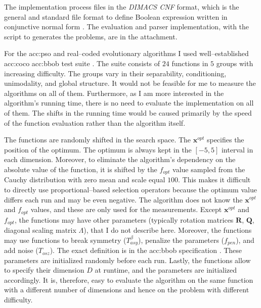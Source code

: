 The implementation process files in the \textit{DIMACS CNF} format, which is the general and standard file format to define Boolean expression written in conjunctive normal form \citep{challenge1993satisfiability}. The evaluation and parser implementation, with the script to generates the problems, are in the attachment.

For the \acrlong{acc:pso} and real--coded evolutionary algorithms I used well--established \acrfull{acc:coco} \acrfull{acc:bbob} test suite \citep{hansen2010comparing}. The suite consists of $24$ functions in $5$ groups with increasing difficulty. The groups vary in their separability, conditioning, unimodality, and global structure. It would not be feasible for me to measure the algorithms on all of them. Furthermore, as I am more interested in the algorithm's running time, there is no need to evaluate the implementation on all of them. The shifts in the running time would be caused primarily by the speed of the function evaluation rather than the algorithm itself.

The functions are randomly shifted in the search space. The $\mathbf{x}^{opt}$ specifies the position of the optimum. The optimum is always kept in the $\left[-5,5\right]$ interval in each dimension. Moreover, to eliminate the algorithm's dependency on the absolute value of the function, it is shifted by the $f_{opt}$ value sampled from the Cauchy distribution with zero mean and scale equal $100$. This makes it difficult to directly use proportional--based selection operators because the optimum value differs each run and may be even negative. The algorithm does not know the $\mathbf{x}^{opt}$ and $f_{opt}$ values, and these are only used for the measurements. Except $\mathbf{x}^{opt}$ and $f_{opt}$, the functions may have other parameters (typically rotation matrices $\mathbf{R}$, $\mathbf{Q}$, diagonal scaling matrix $\Lambda$), that I do not describe here. Moreover, the functions may use functions to break symmetry ($T_{asy}^\beta$), penalize the parameters ($f_{pen}$), and add noise ($T_{osz}$). The exact definition is in the \acrshort{acc:bbob} specification \citep{hansen2010comparing}. These parameters are initialized randomly before each run. Lastly, the functions allow to specify their dimension $D$ at runtime, and the parameters are initialized accordingly. It is, therefore, easy to evaluate the algorithm on the same function with a different number of dimensions and hence on the problem with different difficulty.

